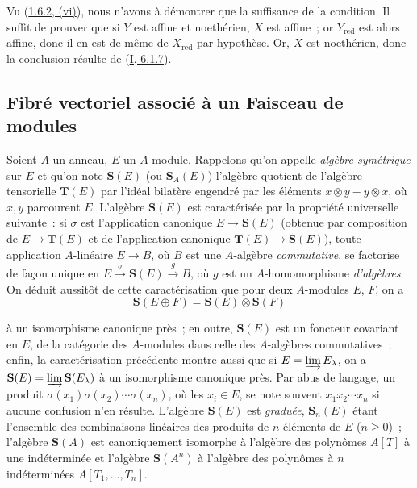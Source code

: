 Vu (\hyperref[II.1.6.2-fr]{1.6.2, (vi)}), nous n'avons à démontrer que la
suffisance de la condition. Il suffit de prouver que si $Y$ est affine et
noethérien, $X$ est affine~; or $Y_{\mathrm{red}}$ est alors affine, donc il
en est de même de $X_{\mathrm{red}}$ par hypothèse. Or, $X$ est noethérien,
donc la conclusion résulte de (\hyperref[I.6.1.7-fr]{I, 6.1.7}).

\subsection{Fibré vectoriel associé à un Faisceau de modules}
\label{II.1.7-fr}

\begin{env}[1.7.1]
\label{II.1.7.1-fr}
Soient $A$ un anneau, $E$ un $A$-module. Rappelons qu'on appelle \emph{algèbre
symétrique} sur $E$ et qu'on note $\mathbf{S}(E)$ (ou $\mathbf{S}_A(E)$)
l'algèbre quotient de l'algèbre tensorielle $\mathbf{T}(E)$ par l'idéal
bilatère engendré par les éléments $x\otimes y-y\otimes x$, où $x,y$
parcourent $E$. L'algèbre $\mathbf{S}(E)$ est caractérisée par la propriété
universelle suivante~: si $\sigma$ est l'application canonique
$E\to\mathbf{S}(E)$ (obtenue par composition de $E\to\mathbf{T}(E)$ et de
l'application canonique $\mathbf{T}(E)\to\mathbf{S}(E)$), toute application
$A$-linéaire $E\to B$, où $B$ est une $A$-algèbre \emph{commutative}, se
factorise de façon unique en
$E\xrightarrow{\sigma}\mathbf{S}(E)\xrightarrow{g}B$, où $g$ est un
$A$-homomorphisme \emph{d'algèbres}. On déduit aussitôt de cette
caractérisation que pour deux $A$-modules $E$, $F$, on a
\[
  \mathbf{S}(E\oplus F)=\mathbf{S}(E)\otimes\mathbf{S}(F)
\]

à un isomorphisme canonique près~; en outre, $\mathbf{S}(E)$ est un foncteur
covariant en $E$, de la catégorie des $A$-modules dans celle des $A$-algèbres
commutatives~; enfin, la caractérisation précédente montre aussi que si
$E=\varinjlim E_\lambda$, on a
$\mathbf{S}(E)=\varinjlim\mathbf{S}(E_\lambda)$ à un isomorphisme canonique
près. Par abus de langage, un produit
$\sigma(x_1)\sigma(x_2)\cdots\sigma(x_n)$, où les $x_i\in E$, se note souvent
$x_1x_2\cdots x_n$ si aucune confusion n'en résulte. L'algèbre
$\mathbf{S}(E)$ est \emph{graduée}, $\mathbf{S}_n(E)$ étant l'ensemble des
combinaisons linéaires des produits de $n$ éléments de $E$ ($n\geq 0$)~;
l'algèbre $\mathbf{S}(A)$ est canoniquement isomorphe à l'algèbre des
polynômes $A[T]$ à une indéterminée et l'algèbre $\mathbf{S}(A^n)$ à
l'algèbre des polynômes à $n$ indéterminées $A[T_1,\ldots,T_n]$.
\end{env}

